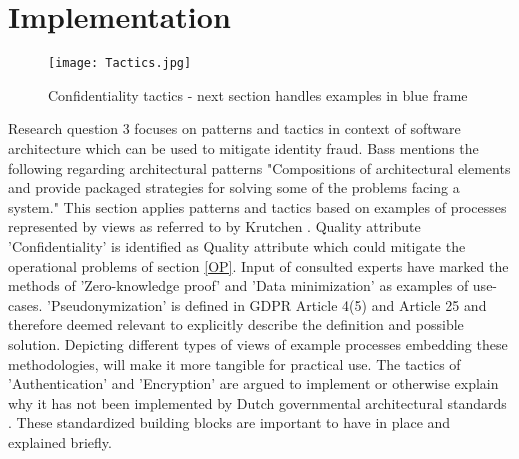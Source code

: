\chapter{Implementation}\label{s:Implementation}

\graphicspath{ {./images/} }
    \begin{figure}
        \centering
        \texttt{[image: Tactics.jpg]}\\
        \caption{Confidentiality tactics - next section handles examples in blue frame}
        \label{fig:Tactics}
    \end{figure}

Research question 3 focuses on patterns and tactics in context of software architecture which can be used to mitigate identity fraud. Bass \etal \cite{Bass2015SoftwareAI} mentions the following regarding architectural patterns "Compositions of architectural elements and provide packaged strategies for solving some of the problems facing a system." This section applies patterns and tactics based on examples of processes represented by views as referred to by Krutchen \cite{Krutchen1995ArchitecturalB}. Quality attribute 'Confidentiality' is identified as Quality attribute which could mitigate the operational problems of section \ref{OP}. Input of consulted experts have marked the methods of 'Zero-knowledge proof' and 'Data minimization' as examples of use-cases. 'Pseudonymization' is defined in GDPR Article 4(5) and Article 25 \cite{GDPR} and therefore deemed relevant to explicitly describe the definition and possible solution. Depicting different types of views of example processes embedding these methodologies, will make it more tangible for practical use. The tactics of 'Authentication' and 'Encryption' are argued to implement or otherwise explain why it has not been implemented by Dutch governmental architectural standards \cite{NORA_PasToeOfLegUit}. These standardized building blocks are important to have in place and explained briefly.


